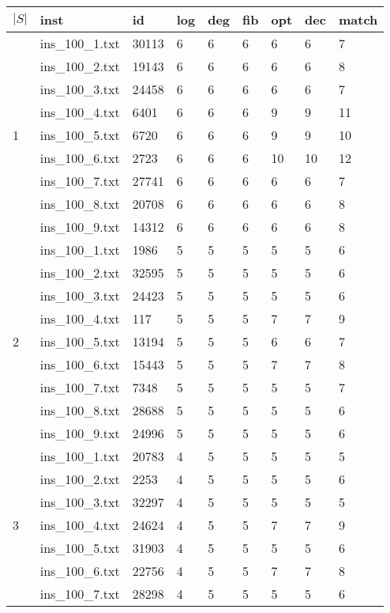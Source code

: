 \begin{table}[]
\begin{tabular}{lllllllll}
 $|S|$ & inst & id & log & deg & fib & opt & dec & match \\\hline
\hline 
\multirow{9}{*}{1}
& ins\_100\_1.txt & 30113 & 6 & 6 & 6 & 6  & 6  & 7 \\
& ins\_100\_2.txt & 19143 & 6 & 6 & 6 & 6  & 6  & 8 \\
& ins\_100\_3.txt & 24458 & 6 & 6 & 6 & 6  & 6  & 7 \\
& ins\_100\_4.txt & 6401  & 6 & 6 & 6 & 9  & 9  & 11 \\
& ins\_100\_5.txt & 6720  & 6 & 6 & 6 & 9  & 9  & 10 \\
& ins\_100\_6.txt & 2723  & 6 & 6 & 6 & 10 & 10 & 12 \\
& ins\_100\_7.txt & 27741 & 6 & 6 & 6 & 6  & 6  & 7 \\
& ins\_100\_8.txt & 20708 & 6 & 6 & 6 & 6  & 6  & 8 \\
& ins\_100\_9.txt & 14312 & 6 & 6 & 6 & 6  & 6  & 8 \\
\hline 
\multirow{9}{*}{2}
& ins\_100\_1.txt & 1986  & 5 & 5 & 5 & 5  & 5  & 6 \\
& ins\_100\_2.txt & 32595 & 5 & 5 & 5 & 5  & 5  & 6 \\
& ins\_100\_3.txt & 24423 & 5 & 5 & 5 & 5  & 5  & 6 \\
& ins\_100\_4.txt & 117   & 5 & 5 & 5 & 7  & 7  & 9 \\
& ins\_100\_5.txt & 13194 & 5 & 5 & 5 & 6  & 6  & 7 \\
& ins\_100\_6.txt & 15443 & 5 & 5 & 5 & 7  & 7  & 8 \\
& ins\_100\_7.txt & 7348  & 5 & 5 & 5 & 5  & 5  & 7 \\
& ins\_100\_8.txt & 28688 & 5 & 5 & 5 & 5  & 5  & 6 \\
& ins\_100\_9.txt & 24996 & 5 & 5 & 5 & 5  & 5  & 6 \\
\hline 
\multirow{9}{*}{3}
& ins\_100\_1.txt & 20783 & 4 & 5 & 5 & 5  & 5  & 5 \\
& ins\_100\_2.txt & 2253  & 4 & 5 & 5 & 5  & 5  & 6 \\
& ins\_100\_3.txt & 32297 & 4 & 5 & 5 & 5  & 5  & 5 \\
& ins\_100\_4.txt & 24624 & 4 & 5 & 5 & 7  & 7  & 9 \\
& ins\_100\_5.txt & 31903 & 4 & 5 & 5 & 5  & 5  & 6 \\
& ins\_100\_6.txt & 22756 & 4 & 5 & 5 & 7  & 7  & 8 \\
& ins\_100\_7.txt & 28298 & 4 & 5 & 5 & 5  & 5  & 6 \\

\end{tabular}
\end{table}
